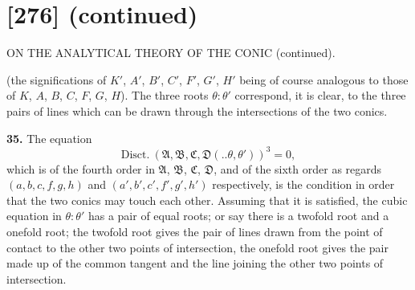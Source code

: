 \documentclass[12pt,a4paper]{article}
\newcommand{\mfA}{\mathfrak{A}}
\newcommand{\mfB}{\mathfrak{B}}
\newcommand{\mfC}{\mathfrak{C}}
\newcommand{\mfD}{\mathfrak{D}}
\newcommand{\qform}[2]{(#1 \mathbin{..} #2)}
\theoremstyle{definition}
\begin{document}
\newpage
\section*{[276] (continued)}
\begin{center}
{\large ON THE ANALYTICAL THEORY OF THE CONIC (continued).}
\end{center}

(the significations of $K'$, $A'$, $B'$, $C'$, $F'$, $G'$, $H'$ being of course analogous to those of $K$, $A$, $B$, $C$, $F$, $G$, $H$). The three roots $\theta : \theta'$ correspond, it is clear, to the three pairs of lines which can be drawn through the intersections of the two conics.

\textbf{35.} The equation
\[
\text{Disct.}\ (\mfA, \mfB, \mfC, \mfD \!\qform{}{\theta, \theta'})^{3} = 0,
\]
which is of the fourth order in $\mfA$, $\mfB$, $\mfC$, $\mfD$, and of the sixth order as regards $(a, b, c, f, g, h)$ and $(a', b', c', f', g', h')$ respectively, is the condition in order that the two conics may touch each other. Assuming that it is satisfied, the cubic equation in $\theta : \theta'$ has a pair of equal roots; or say there is a twofold root and a onefold root; the twofold root gives the pair of lines drawn from the point of contact to the other two points of intersection, the onefold root gives the pair made up of the common tangent and the line joining the other two points of intersection.
\end{document}
